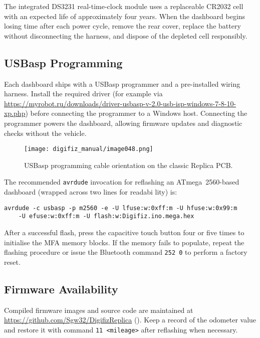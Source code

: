 The integrated DS3231 real-time-clock module uses a replaceable CR2032 cell with an expected life of approximately four years.
When the dashboard begins losing time after each power cycle, remove the rear cover, replace the battery without disconnecting the harness, and dispose of the depleted cell responsibly.

\subsection{USBasp Programming}

Each dashboard ships with a USBasp programmer and a pre-installed wiring harness.
Install the required driver (for example via \url{https://myrobot.ru/downloads/driver-usbasp-v-2.0-usb-isp-windows-7-8-10-xp.php}) before connecting the programmer to a Windows host.
Connecting the programmer powers the dashboard, allowing firmware updates and diagnostic checks without the vehicle.

\begin{figure}[htbp]
    \centering
    \texttt{[image: digifiz\_manual/image048.png]}
    \caption{USBasp programming cable orientation on the classic Replica PCB.}
    \label{fig:usbasp-orientation}
\end{figure}

The recommended \texttt{avrdude} invocation for reflashing an ATmega~2560-based dashboard (wrapped across two lines for readabi
lity) is:
\begin{verbatim}
avrdude -c usbasp -p m2560 -e -U lfuse:w:0xff:m -U hfuse:w:0x99:m
    -U efuse:w:0xff:m -U flash:w:Digifiz.ino.mega.hex
\end{verbatim}

After a successful flash, press the capacitive touch button four or five times to initialise the MFA memory blocks.
If the memory fails to populate, repeat the flashing procedure or issue the Bluetooth command \verb|252 0| to perform a factory reset.

\subsection{Firmware Availability}

Compiled firmware images and source code are maintained at \url{https://github.com/Sgw32/DigifizReplica} ().
Keep a record of the odometer value and restore it with command \verb|11 <mileage>| after reflashing when necessary.
